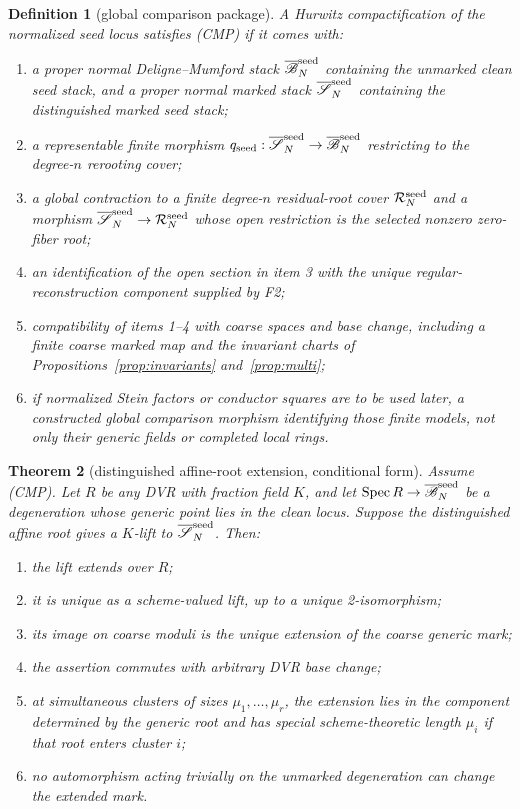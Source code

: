 \documentclass[11pt]{article}
\newtheorem{theorem}{Theorem}[section]
\newtheorem{definition}[theorem]{Definition}
\newcommand{\Spec}{\operatorname{Spec}}
\newcommand{\ol}{\overline}
\begin{document}
\begin{definition}[global comparison package]\label{def:comparison}
A Hurwitz compactification of the normalized seed locus satisfies
\textup{(CMP)} if it comes with:
\begin{enumerate}
\item a proper normal Deligne--Mumford stack $\ol{\mathscr B}^{\rm seed}_N$
containing the unmarked clean seed stack, and a proper normal marked stack
$\ol{\mathscr S}^{\rm seed}_N$ containing the distinguished marked seed
stack;
\item a representable finite morphism
$q_{\rm seed}:\ol{\mathscr S}^{\rm seed}_N\to
\ol{\mathscr B}^{\rm seed}_N$ restricting to the degree-$n$ rerooting cover;
\item a global contraction to a finite degree-$n$ residual-root cover
$\mathcal R^{\rm seed}_N$ and a morphism
$\ol{\mathscr S}^{\rm seed}_N\to\mathcal R^{\rm seed}_N$ whose open
restriction is the selected nonzero zero-fiber root;
\item an identification of the open section in item 3 with the unique
regular-reconstruction component supplied by F2;
\item compatibility of items 1--4 with coarse spaces and base change,
including a finite coarse marked map and the invariant charts of
Propositions~\ref{prop:invariants} and~\ref{prop:multi};
\item if normalized Stein factors or conductor squares are to be used later,
a constructed global comparison morphism identifying those finite models,
not only their generic fields or completed local rings.
\end{enumerate}
\end{definition}

\begin{theorem}[distinguished affine-root extension, conditional form]
\label{thm:main}
Assume \textup{(CMP)}.  Let $R$ be any DVR with fraction field $K$, and let
$\Spec R\to\ol{\mathscr B}^{\rm seed}_N$ be a degeneration whose generic
point lies in the clean locus.  Suppose the distinguished affine root gives
a $K$-lift to $\ol{\mathscr S}^{\rm seed}_N$.  Then:
\begin{enumerate}
\item the lift extends over $R$;
\item it is unique as a scheme-valued lift, up to a unique 2-isomorphism;
\item its image on coarse moduli is the unique extension of the coarse
generic mark;
\item the assertion commutes with arbitrary DVR base change;
\item at simultaneous clusters of sizes $\mu_1,\ldots,\mu_r$, the extension
lies in the component determined by the generic root and has special
scheme-theoretic length $\mu_i$ if that root enters cluster $i$;
\item no automorphism acting trivially on the unmarked degeneration can
change the extended mark.
\end{enumerate}
\end{theorem}
\end{document}
